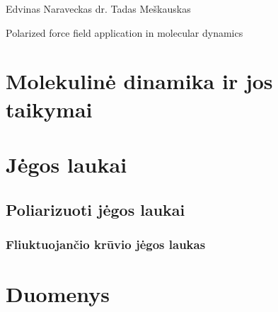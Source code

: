 \documentclass[a4paper,12pt,fleqn,tikz]{article}
\begin{document}
    {Edvinas Naraveckas}
    {}{}{}{}%
    {dr. Tadas Meškauskas}

    \tableofcontents



    \bothabstracts{}%
    {Polarized force field application in molecular dynamics} %
    {}%


    



    \newpage
    \section{Molekulinė dinamika ir jos taikymai}
    \label{sec:molecular_dynamics_section}
    


    \newpage
    \section{Jėgos laukai}
    \label{sec:force_field}
    


    \subsection{Poliarizuoti jėgos laukai}
    \label{sec:polarized_force_fields}
    


    \subsubsection{Fliuktuojančio krūvio jėgos laukas}
    \label{sec:fluctuating_charge}
    



    \newpage
    \section{Duomenys}
    \label{sec:data}
\end{document}
